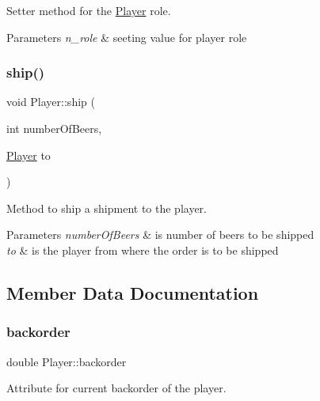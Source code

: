 Setter method for the \hyperlink{class_player}{Player} role. 


\begin{DoxyParams}{Parameters}
{\em n\+\_\+role} & seeting value for player role \\
\hline
\end{DoxyParams}
\mbox{\label{class_player_a68db574596d1ca040f454d34310149ee}} 
\subsubsection{\texorpdfstring{ship()}{ship()}}
{\footnotesize\ttfamily void Player\+::ship (\begin{DoxyParamCaption}\item[{int}]{number\+Of\+Beers,  }\item[{\hyperlink{class_player}{Player}}]{to }\end{DoxyParamCaption})}



Method to ship a shipment to the player. 


\begin{DoxyParams}{Parameters}
{\em number\+Of\+Beers} & is number of beers to be shipped \\
\hline
{\em to} & is the player from where the order is to be shipped \\
\hline
\end{DoxyParams}


\subsection{Member Data Documentation}
\mbox{\label{class_player_a691751190c6389e1aef1b5b949cb11b7}} 
\subsubsection{\texorpdfstring{backorder}{backorder}}
{\footnotesize\ttfamily double Player\+::backorder\hspace{0.3cm}{\ttfamily [private]}}



Attribute for current backorder of the player. 

\mbox{\label{class_player_a7477b3893f2805a36042e96b4aeb2151}} 
